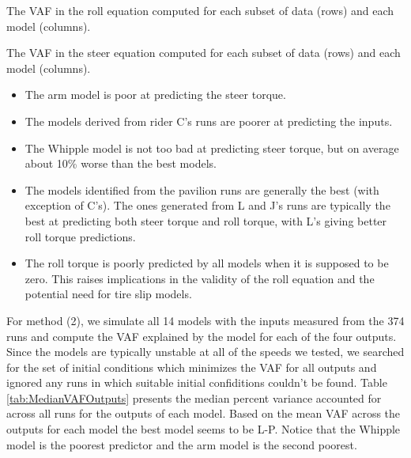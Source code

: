 \documentclass[a4paper]{article}
\begin{document}
\begin{table}
  \caption{The VAF in the roll equation computed for each subset of data (rows)
  and each model (columns).}
  \label{tab:roll-r-squared}
  \tiny
  
\end{table}

\begin{table}
  \caption{The VAF in the steer equation computed for each subset of data (rows)
  and each model (columns).}
  \label{tab:steer-r-squared}
  \tiny
  
\end{table}

\begin{itemize}
  \item
    The arm model is poor at predicting the steer torque.
  \item
    The models derived from rider C's runs are poorer at predicting the inputs.
  \item
    The Whipple model is not too bad at predicting steer torque, but on
    average about 10\% worse than the best models.
  \item
    The models identified from the pavilion runs are generally the best (with
    exception of C's). The ones generated from L and J's runs are typically the
    best at predicting both steer torque and roll torque, with L's giving
    better roll torque predictions.
  \item
    The roll torque is poorly predicted by all models when it is supposed
    to be zero. This raises implications in the validity of the roll
    equation and the potential need for tire slip models.
\end{itemize}

For method (2), we simulate all 14 models with the inputs measured from the 374
runs and compute the VAF explained by the model for each of the four outputs.
Since the models are typically unstable at all of the speeds we tested, we
searched for the set of initial conditions which minimizes the VAF for all
outputs and ignored any runs in which suitable initial confiditions couldn't be
found. Table \ref{tab:MedianVAFOutputs} presents the median percent variance
accounted for across all runs for the outputs of each model. Based on the mean
VAF across the outputs for each model the best model seems to be L-P. Notice
that the Whipple model is the poorest predictor and the arm model is the second
poorest.
\end{document}

